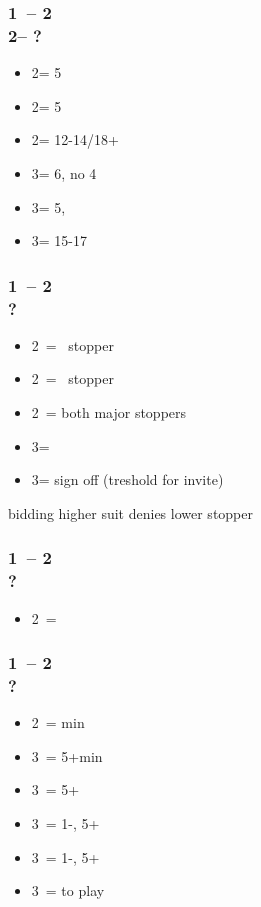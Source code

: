 \documentclass[12pt, a4paper]{article}
\begin{document}
\subsubsection*{1\clubs\ -- 2\clubs \\
                2\diams -- ?}
\begin{itemize}
    \item 2\hearts = 5\hearts\ \unbal
    \item 2\spades = 5\spades\ \unbal
    \item 2\nt = 12-14/18+ \bal
    \item 3\clubs = 6\clubs, no 4\major
    \item 3\diams = 5\diams, \gf
    \item 3\nt = 15-17 \bal
\end{itemize}

\subsubsection*{1\diams\ -- 2\diams \\ ?}
\begin{itemize}
    \item 2\hearts\ = \hearts\ stopper
    \item 2\spades\ = \spades\ stopper
    \item 2\nt\ = both major stoppers
    \item 3\clubs = \nat
    \item 3\diams = sign off (treshold for invite)
\end{itemize}

bidding higher suit denies lower stopper

\subsubsection*{1\minor\ -- 2\hearts \\ ?}
\begin{itemize}
    \item 2\nt\ = \lsf
\end{itemize}

\subsubsection*{1\clubs\ -- 2\spades \\ ?}
\begin{itemize}
    \item 2\nt\ = \bal min
    \item 3\clubs\ = 5+\clubs min
    \item 3\diams\ = 5+\clubs \gf
    \item 3\hearts\ = 1-\hearts, 5+\clubs\ \gf
    \item 3\spades\ = 1-\spades, 5+\clubs\ \gf
    \item 3\nt\ = to play
\end{itemize}
\end{document}
